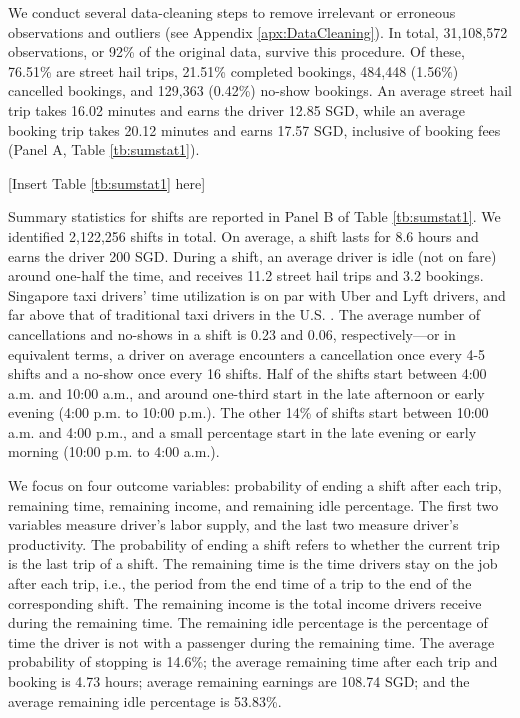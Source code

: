 \documentclass[reviewmode,AEJ]{AEA}
\begin{document}
We conduct several data-cleaning steps to remove irrelevant or erroneous observations and outliers (see Appendix \ref{apx:DataCleaning}).
In total, 31,108,572 observations, or 92\% of the original data, survive this procedure. Of these, 76.51\% are
street hail trips, 21.51\% completed bookings, 484,448 (1.56\%) cancelled bookings, and 129,363 (0.42\%) no-show
bookings. An average street hail trip takes 16.02 minutes and earns the driver 12.85 SGD, while an average  
booking trip takes 20.12 minutes and earns 17.57 SGD, inclusive of booking fees (Panel A, Table \ref{tb:sumstat1}).


\begin{center}
	[Insert Table \ref{tb:sumstat1} here]
\end{center}


Summary statistics for shifts are reported in Panel B of Table \ref{tb:sumstat1}. 
We identified 2,122,256 shifts in total. On average, a shift lasts for 8.6 hours and earns the driver 200 SGD. 
During a shift, an average driver is idle (not on fare) around one-half the time, and receives 11.2 street
hail trips and 3.2 bookings.  Singapore taxi drivers' time utilization is on par with Uber and Lyft drivers,
and far above that of traditional taxi drivers in the U.S. \citep{cramer2016disruptive}.
The average number of cancellations and no-shows in a shift is 0.23 and 0.06, respectively---or in equivalent terms,
a driver on average encounters a cancellation once every 4-5 shifts and a no-show once every 16 shifts.
Half of the shifts start between 4:00 a.m. and 10:00 a.m., and around one-third start in the late afternoon 
or early evening (4:00 p.m. to 10:00 p.m.). The other 14\% of shifts start between 10:00 a.m. and 4:00 p.m.,
and a small percentage start in the late evening or early morning (10:00 p.m. to 4:00 a.m.).


We focus on four outcome variables: probability of ending a shift after each trip, remaining time, 
remaining income, and remaining idle percentage. The first two variables measure driver's labor supply, 
and the last two measure driver's productivity. The probability of ending a shift refers to whether the 
current trip is the last trip of a shift. The remaining time is the time drivers stay on the job after
each trip, i.e., the period from the end time of a trip to the end of the corresponding shift. 
The remaining income is the total income drivers receive during the remaining time. 
The remaining idle percentage is the percentage of time the driver is not with a passenger during the remaining time.
The average probability of stopping is 14.6\%; the average remaining time after each trip and booking is 4.73 hours; 
average remaining earnings are 108.74 SGD; 
and the average remaining idle percentage is 53.83\%. 
\end{document}
